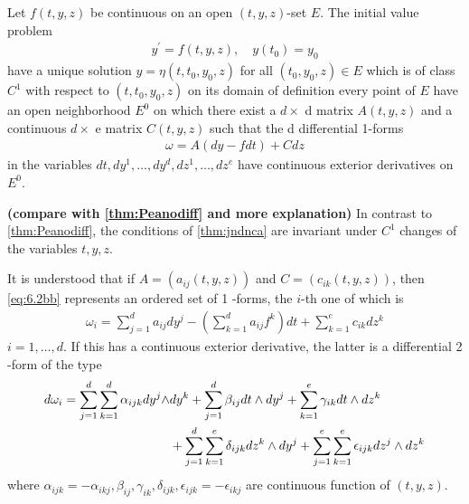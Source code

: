 \documentclass{article}
\newcommand{\bfs}[1]{\textbf{({#1}) }}
\begin{document}
\begin{thma}\label{thm:jndnca}
   Let $f(t, y, z)$ be continuous on an open $(t, y, z)$-set $E$. %
   The initial value problem
\begin{align*}
y^{\prime}=f(t, y, z), \quad y\left(t_{0}\right)=y_{0}
\end{align*}
have a unique solution $y=\eta\left(t, t_{0}, y_{0}, z\right)$ for all $\left(t_{0}, y_{0}, z\right) \in E$ which is of class $C^{1}$ with respect to $\left(t, t_{0}, y_{0}, z\right)$ on its domain of definition  every point of $E$ have an open neighborhood $E^{0}$ on which there exist a  $d \times$ d matrix $A(t, y, z)$ and a continuous $d \times$ e matrix $C(t, y, z)$ such that the d differential 1-forms
\begin{align}
\omega=A(d y-f d t)+C d z\label{eq:6.2bb}
\end{align}
in the variables $d t, d y^{1}, \ldots, d y^{d}, d z^{1}, \ldots, d z^{e}$ have continuous exterior derivatives on $E^{0}$.
\end{thma}
\begin{rema}\bfs{compare with \cref{thm:Peanodiff} and more explanation}
In contrast to \cref{thm:Peanodiff}, the conditions of \cref{thm:jndnca} are invariant under $C^{1}$ changes of the variables $t, y, z$.

It is understood that if $A=\left(a_{i j}(t, y, z)\right)$ and $C=\left(c_{i k}(t, y, z)\right)$, then \cref{eq:6.2bb} represents an ordered set of 1 -forms, the $i$-th one of which is
\begin{align*}
\omega_{i}=\sum_{j=1}^{d} a_{i j} d y^{j}-\left(\sum_{k=1}^{d} a_{i j} f^{k}\right) d t+\sum_{k=1}^{e} c_{i k} d z^{k}
\end{align*}
$i=1, \ldots, d .$ If this has a continuous exterior derivative, the latter is a differential 2 -form of the type
\begin{align}
    d \omega_{i}=\sum_{j=1}^{d} \sum_{k=1}^{d} \alpha_{i j k} d y^{j} \wedge & d y^{k}+\sum_{j=1}^{d} \beta_{i j} d t \wedge d y^{j}+\sum_{k=1}^{e} \gamma_{i k} d t \wedge d z^{k}\nonumber\\ 
    &+\sum_{j=1}^{d} \sum_{k=1}^{e} \delta_{i j k} d z^{k} \wedge d y^{j}+\sum_{j=1}^{e} \sum_{k=1}^{e} \epsilon_{i j k} d z^{j} \wedge d z^{k}
\end{align}
where $\alpha_{i j k}=-\alpha_{i k j}, \beta_{i j}, \gamma_{i k}, \delta_{i j k}, \epsilon_{i j k}=-\epsilon_{i k j}$ are continuous function of $(t, y, z) .$ 
\end{rema}
\end{document}

